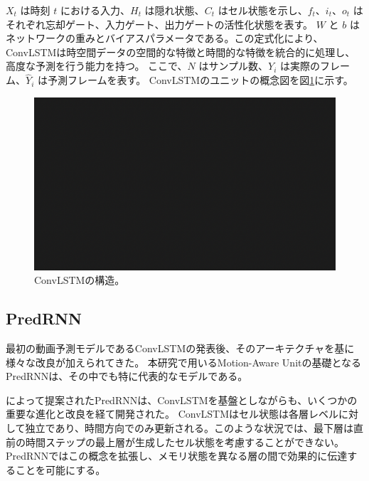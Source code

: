       \( X_t \) は時刻 \( t \) における入力、\( H_t \) は隠れ状態、\( C_t \) はセル状態を示し、\( f_t \)、\( i_t \)、\( o_t \) はそれぞれ忘却ゲート、入力ゲート、出力ゲートの活性化状態を表す。
      \( W \) と \( b \) はネットワークの重みとバイアスパラメータである。この定式化により、ConvLSTMは時空間データの空間的な特徴と時間的な特徴を統合的に処理し、高度な予測を行う能力を持つ。
      ここで、\( N \) はサンプル数、\( Y_i \) は実際のフレーム、\( \hat{Y}_i \) は予測フレームを表す。
      ConvLSTMのユニットの概念図を図\ref{fig:convlstm}に示す。
      \begin{figure}[htbp]
        \centering
        \includegraphics[width=\textwidth]{figures/sample.png}
        \caption{ConvLSTMの構造。}
        \label{fig:convlstm}
      \end{figure}

    \subsection{PredRNN}
      最初の動画予測モデルであるConvLSTMの発表後、そのアーキテクチャを基に様々な改良が加えられてきた。
      本研究で用いるMotion-Aware Unitの基礎となるPredRNNは、その中でも特に代表的なモデルである。

      によって提案されたPredRNNは、ConvLSTMを基盤としながらも、いくつかの重要な進化と改良を経て開発された。
      ConvLSTMはセル状態は各層レベルに対して独立であり、時間方向でのみ更新される。このような状況では、最下層は直前の時間ステップの最上層が生成したセル状態を考慮することができない。
      PredRNNではこの概念を拡張し、メモリ状態を異なる層の間で効果的に伝達することを可能にする。
        
